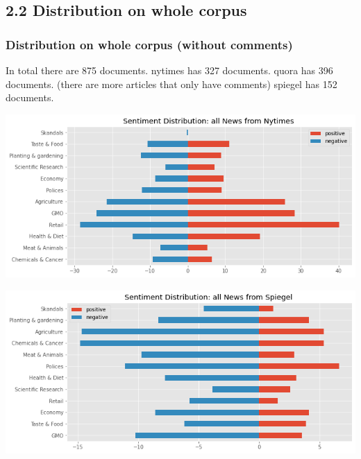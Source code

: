 \documentclass{tum-presentation}
\begin{document}
\subsection{2.2 Distribution on whole corpus}
\begin{frame}
  \frametitle{Distribution on whole corpus (without comments)}
  In total there are 875 documents.
  nytimes has 327 documents.
  quora has 396 documents. (there are more articles that only have comments)
  spiegel has 152 documents.
\\[2ex]
\begin{minipage}{0.5\linewidth}
    \begin{center}
    \includegraphics[width = 1\textwidth]{figures/nytimes_sentiments_2.png}
    \end{center}
  \end{minipage}%
  \hfill
    \begin{minipage}{0.5\linewidth}
    \begin{center}
    \includegraphics[width = 1\textwidth]{figures/spiegel_sentiments_2.png}
    \end{center}
  \end{minipage}%
  \hfill

\end{frame}
\end{document}
